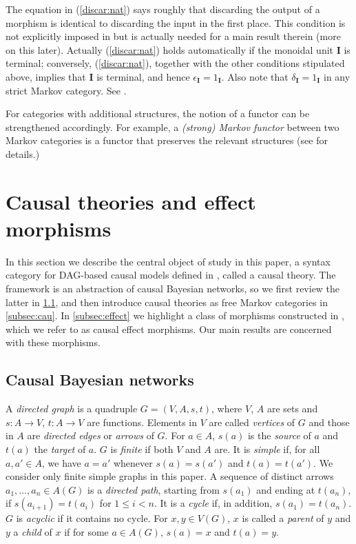 \documentclass[12pt]{amsart}
\theoremstyle{plain}
\theoremstyle{definition}
\theoremstyle{remark}
\numberwithin{equation}{section}
\theoremstyle{plain}
\newcommand{\0}{\emptyset}
\newcommand{\fun}{\longrightarrow}
\newcommand{\memph}[1]{{\color{magenta}\emph{#1}}}
\newcommand{\moi}{\mathbf{I}}
\begin{document}
The equation in (\ref{discar:nat}) says roughly that discarding the output of a morphism is identical to discarding the input in the first place. This condition is not explicitly imposed in \cite{Fong:thesis} but is actually needed for a main result therein (more on this later). Actually (\ref{discar:nat})  holds automatically if the monoidal unit $\moi$ is terminal; conversely, (\ref{discar:nat}), together with the other conditions stipulated above, implies that  $\moi$ is terminal, and hence $\epsilon_\moi  = 1_\moi$. Also note that $\delta_\moi = 1_\moi$  in any strict Markov category. See \cite[Remark~2.3]{fritz2020synthetic}.

For categories with additional structures, the notion of a functor can be strengthened accordingly. For example, a \memph{(strong) Markov functor} between two Markov categories is a functor that preserves the relevant structures (see \cite[Definition~10.14]{fritz2020synthetic} for details.)


\section{Causal theories and effect morphisms}
\label{sec:cau}

In this section we describe the central object of study in this paper, a syntax category for DAG-based causal models defined in \cite{Fong:thesis}, called a causal theory. The framework is an abstraction of causal Bayesian networks, so we first review the latter in \ref{subsec:cbn}, and then introduce causal theories as free Markov categories in \ref{subsec:cau}. In \ref{subsec:effect} we highlight a class of morphisms constructed in \cite{Fong:thesis}, which we refer to as causal effect morphisms. Our main results are concerned with these morphisms.

\subsection{Causal Bayesian networks} \label{subsec:cbn}
 A \memph{directed graph} is a quadruple  $G = (V, A, s, t)$, where $V$, $A$ are sets and $s : A \fun V$, $t: A \fun V$ are functions. Elements in $V$ are called \memph{vertices} of $G$ and those in $A$ are \memph{directed edges} or \memph{arrows} of $G$. For $a\in A$, $s(a)$ is the \memph{source} of $a$ and $t(a)$ the \memph{target} of $a$. $G$ is \memph{finite} if both $V$ and $A$ are. It is \memph{simple} if, for all $a, a'\in A$, we have $a=a'$ whenever $s(a)=s(a')$ and $t(a)=t(a')$. We consider only finite simple graphs in this paper. A sequence of distinct arrows $a_1, \ldots, a_n \in A(G)$ is a \memph{directed path}, starting from $s(a_1)$ and ending at $t(a_n)$, if $s(a_{i+1}) = t(a_i)$ for $1 \leq i < n$. It is a \memph{cycle} if, in addition, $s(a_1) = t(a_n)$. $G$ is \memph{acyclic} if it contains no cycle. For $x, y\in V(G)$, $x$ is called a \memph{parent} of $y$ and $y$ a \memph{child} of $x$ if for some $a\in A(G)$, $s(a)=x$ and $t(a)=y$.
\end{document}
